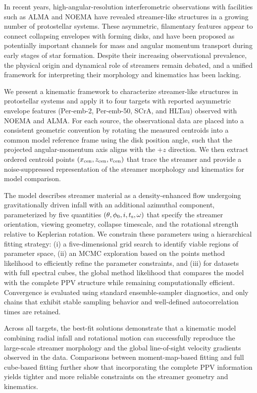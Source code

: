 In recent years, high-angular-resolution interferometric observations with facilities such as ALMA and NOEMA have revealed streamer-like structures in a growing number of protostellar systems. These asymmetric, filamentary features appear to connect collapsing envelopes with forming disks, and have been proposed as potentially important channels for mass and angular momentum transport during early stages of star formation. Despite their increasing observational prevalence, the physical origin and dynamical role of streamers remain debated, and a unified framework for interpreting their morphology and kinematics has been lacking.

We present a kinematic framework to characterize streamer-like structures in protostellar systems and apply it to four targets with reported asymmetric envelope features (Per-emb-2, Per-emb-50, SCrA, and HLTau) observed with NOEMA and ALMA. For each source, the observational data are placed into a consistent geometric convention by rotating the measured centroids into a common model reference frame using the disk position angle, such that the projected angular-momentum axis aligns with the $+z$ direction. We then extract ordered centroid points $(x_{\rm cen},z_{\rm cen},v_{\rm cen})$ that trace the streamer and provide a noise-suppressed representation of the streamer morphology and kinematics for model comparison.

The model describes streamer material as a density-enhanced flow undergoing gravitationally driven infall with an additional azimuthal component, parameterized by five quantities $(\theta,\phi_0,i,t_{\rm s},\omega)$ that specify the streamer orientation, viewing geometry, collapse timescale, and the rotational strength relative to Keplerian rotation. We constrain these parameters using a hierarchical fitting strategy: (i) a five-dimensional grid search to identify viable regions of parameter space, (ii) an MCMC exploration based on the points method likelihood to efficiently refine the parameter constraints, and (iii) for datasets with full spectral cubes, the global method likelihood that compares the model with the complete PPV structure while remaining computationally efficient. Convergence is evaluated using standard ensemble-sampler diagnostics, and only chains that exhibit stable sampling behavior and well-defined autocorrelation times are retained.

Across all targets, the best-fit solutions demonstrate that a kinematic model combining radial infall and rotational motion can successfully reproduce the large-scale streamer morphology and the global line-of-sight velocity gradients observed in the data. Comparisons between moment-map-based fitting and full cube-based fitting further show that incorporating the complete PPV information yields tighter and more reliable constraints on the streamer geometry and kinematics.


